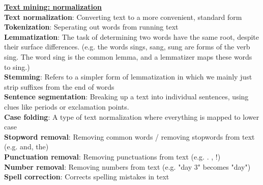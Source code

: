 \documentclass[a4paper,7pt,landscape]{extarticle}
\begin{document}
\begin{multicols}{3}
\begin{boxA}
\underline{\textbf{Text mining: normalization}}\\
\textbf{Text normalization}: Converting text to a more convenient, standard form\\
\textbf{Tokenization}: Seperating out words from running text\\
\textbf{Lemmatization}: The task of determining two words have the same root, despite their surface differences. (e.g. the words sings, sang, sung are forms of the verb sing. The word sing is the common lemma, and a lemmatizer maps these words to sing.)\\
\textbf{Stemming}: Refers to a simpler form of lemmatization  in which we mainly just strip suffixes from the end of words\\
\textbf{Sentence segmentation}: Breaking up a text into individual sentences, using clues like periods or exclamation points.\\
\textbf{Case folding}: A type of text normalization where everything is mapped to lower case\\
\textbf{Stopword removal}: Removing common words / removing stopwords from text (e.g. and, the)\\
\textbf{Punctuation removal}: Removing punctuations from text (e.g. . , !)\\
\textbf{Number removal}: Removing numbers from text (e.g. "day 3" becomes "day")\\
\textbf{Spell correction}: Corrects spelling mistakes in text
\end{boxA}


\end{multicols}
\end{document}
